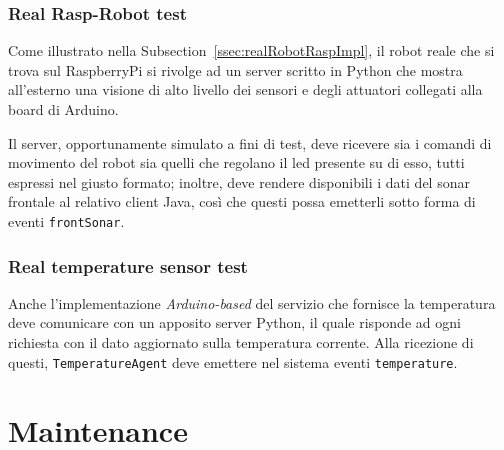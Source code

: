 \documentclass{../llncs}
\newcommand{\codescript}[1]{{\mbox{\small{\texttt{#1}}}}\xspace}
\newcommand{\labelsec}[1]{\label{sec:#1}}
\newcommand{\xss}[1]{\subsectionname~\ref{ssec:#1}}
\newcommand{\subsectionname}{Subsection}
\begin{document}


\subsubsection{Real Rasp-Robot test}
Come illustrato nella \xss{realRobotRaspImpl}, il robot reale che si trova sul RaspberryPi si rivolge ad un server scritto in Python che mostra all'esterno una visione di alto livello dei sensori e degli attuatori collegati alla board di Arduino.

Il server, opportunamente simulato a fini di test, deve ricevere sia i comandi di movimento del robot sia quelli che regolano il led presente su di esso, tutti espressi nel giusto formato; inoltre, deve rendere disponibili i dati del sonar frontale al relativo client Java, così che questi possa emetterli sotto forma di eventi \codescript{frontSonar}.\\



\subsubsection{Real temperature sensor test}
Anche l'implementazione \textit{Arduino-based} del servizio che fornisce la temperatura deve comunicare con un apposito server Python, il quale risponde ad ogni richiesta con il dato aggiornato sulla temperatura corrente. Alla ricezione di questi, \codescript{TemperatureAgent} deve emettere nel sistema eventi \codescript{temperature}.\\




\section{Maintenance}
\labelsec{Maintenance}
\end{document}
